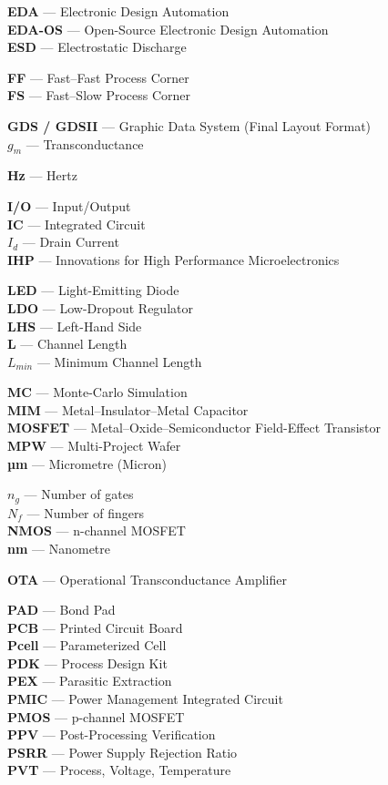 \documentclass[
  11pt,
  a4paper,
  oneside]{scrbook}
\begin{document}
\textbf{EDA} --- Electronic Design Automation\\
\textbf{EDA-OS} --- Open-Source Electronic Design Automation\\
\textbf{ESD} --- Electrostatic Discharge

\textbf{FF} --- Fast--Fast Process Corner\\
\textbf{FS} --- Fast--Slow Process Corner

\textbf{GDS / GDSII} --- Graphic Data System (Final Layout Format)\\
\textbf{\(g_m\)} --- Transconductance

\textbf{Hz} --- Hertz

\textbf{I/O} --- Input/Output\\
\textbf{IC} --- Integrated Circuit\\
\textbf{\(I_d\)} --- Drain Current\\
\textbf{IHP} --- Innovations for High Performance Microelectronics

\textbf{LED} --- Light-Emitting Diode\\
\textbf{LDO} --- Low-Dropout Regulator\\
\textbf{LHS} --- Left-Hand Side\\
\textbf{L} --- Channel Length\\
\textbf{\(L_{min}\)} --- Minimum Channel Length

\textbf{MC} --- Monte-Carlo Simulation\\
\textbf{MIM} --- Metal--Insulator--Metal Capacitor\\
\textbf{MOSFET} --- Metal--Oxide--Semiconductor Field-Effect
Transistor\\
\textbf{MPW} --- Multi-Project Wafer\\
\textbf{µm} --- Micrometre (Micron)

\textbf{\(n_g\)} --- Number of gates\\
\textbf{\(N_f\)} --- Number of fingers\\
\textbf{NMOS} --- n-channel MOSFET\\
\textbf{nm} --- Nanometre

\textbf{OTA} --- Operational Transconductance Amplifier

\textbf{PAD} --- Bond Pad\\
\textbf{PCB} --- Printed Circuit Board\\
\textbf{Pcell} --- Parameterized Cell\\
\textbf{PDK} --- Process Design Kit\\
\textbf{PEX} --- Parasitic Extraction\\
\textbf{PMIC} --- Power Management Integrated Circuit\\
\textbf{PMOS} --- p-channel MOSFET\\
\textbf{PPV} --- Post-Processing Verification\\
\textbf{PSRR} --- Power Supply Rejection Ratio\\
\textbf{PVT} --- Process, Voltage, Temperature
\end{document}
